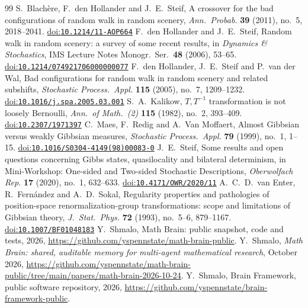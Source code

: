 \documentclass[11pt]{amsart}
\theoremstyle{remark}
\newcommand{\doi}[1]{\href{https://doi.org/#1}{doi:\nolinkurl{#1}}}
\begin{document}
\begin{thebibliography}{99}
 S.~Blach\`ere, F.~den Hollander and J.~E.~Steif, A crossover for the bad configurations of random walk
in random scenery, \emph{Ann.\ Probab.} \textbf{39} (2011), no.~5, 2018--2041. \doi{10.1214/11-AOP664}
 F.~den Hollander and J.~E.~Steif, Random walk in random scenery: a survey of some recent results, in
\emph{Dynamics \& Stochastics}, IMS Lecture Notes Monogr.\ Ser.\ \textbf{48} (2006), 53--65.
\doi{10.1214/074921706000000077}
 F.~den Hollander, J.~E.~Steif and P.~van der Wal, Bad configurations for random walk in random scenery
and related subshifts, \emph{Stochastic Process.\ Appl.} \textbf{115} (2005), no.~7, 1209--1232.
\doi{10.1016/j.spa.2005.03.001}
 S.~A.~Kalikow, $T,T^{-1}$ transformation is not loosely Bernoulli, \emph{Ann.\ of Math.\ (2)} \textbf{115}
(1982), no.~2, 393--409. \doi{10.2307/1971397}
 C.~Maes, F.~Redig and A.~Van Moffaert, Almost Gibbsian versus weakly Gibbsian measures,
\emph{Stochastic Process.\ Appl.} \textbf{79} (1999), no.~1, 1--15. \doi{10.1016/S0304-4149(98)00083-0}
 J.~E.~Steif, Some results and open questions concerning Gibbs states, quasilocality and bilateral
determinism, in Mini-Workshop: One-sided and Two-sided Stochastic Descriptions, \emph{Oberwolfach Rep.} \textbf{17}
(2020), no.~1, 632--633. \doi{10.4171/OWR/2020/11}
 A.~C.~D.~van Enter, R.~Fern\'andez and A.~D.~Sokal, Regularity properties and pathologies of
position-space renormalization-group transformations: scope and limitations of Gibbsian theory, \emph{J.\ Stat.\ Phys.}
\textbf{72} (1993), no.~5--6, 879--1167. \doi{10.1007/BF01048183}
 Y.~Shmalo, Math Brain: public snapshot, code and tests, 2026,
\url{https://github.com/yspennstate/math-brain-public}.
 Y.~Shmalo, \emph{Math Brain: shared, auditable memory for multi-agent mathematical research},
October 2026, \url{https://github.com/yspennstate/math-brain-public/tree/main/papers/math-brain-2026-10-24}.
 Y.~Shmalo, Brain Framework, public software repository, 2026,
\url{https://github.com/yspennstate/brain-framework-public}.
\end{thebibliography}
\end{document}
